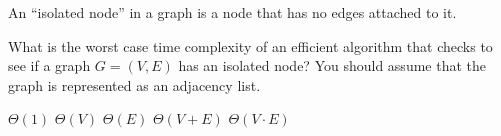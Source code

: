 \Needspace{2.5in}
\begin{prob}

    An ``isolated node'' in a graph is a node that has no edges attached to it.

    What is the worst case time complexity of an efficient algorithm that
    checks to see if a graph $G = (V, E)$ has an isolated node? You should
    assume that the graph is represented as an adjacency list.

    \begin{choices}
        \choice $\Theta(1)$
        \correctchoice $\Theta(V)$
        \choice $\Theta(E)$
        \choice $\Theta(V + E)$
        \choice $\Theta(V \cdot E)$
    \end{choices}


\end{prob}
